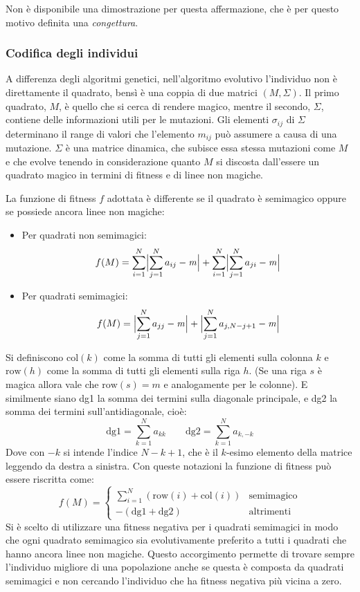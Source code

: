 \documentclass[italian,twoside,twocolumn]{article}
\begin{document}
Non è disponibile una dimostrazione per questa affermazione, che è per questo motivo definita una \emph{congettura}.

\subsubsection{Codifica degli individui}
A differenza degli algoritmi genetici, nell'algoritmo evolutivo l'individuo non è direttamente il quadrato, bensì è una coppia di due matrici $ \left(M, \Sigma \right) $. Il primo quadrato, $ M $, è quello che si cerca di rendere magico, mentre il secondo, $ \Sigma $, contiene delle informazioni utili per le mutazioni. Gli elementi $ \sigma_{ij} $ di $ \Sigma $ determinano il range di valori che l'elemento $ m_{ij} $ può assumere a causa di una mutazione. $ \Sigma $ è una matrice dinamica, che subisce essa stessa mutazioni come $ M $ e che evolve tenendo in considerazione quanto $ M $ si discosta dall'essere un quadrato magico in termini di fitness e di linee non magiche.

La funzione di fitness $ f $ adottata è differente se il quadrato è semimagico oppure se possiede ancora linee non magiche:
\begin{itemize}
	\item Per quadrati non semimagici:
	\[	f(M) = \sum_{i=1}^{N}\Bigl\lvert\sum_{j=1}^{N} a_{ij} - \mathit{m} \Bigr\rvert + \sum_{i=1}^{N}\Bigl\lvert\sum_{j=1}^{N} a_{ji} - \mathit{m} \Bigr\rvert 	\]
	\item Per quadrati semimagici:
	\[	f(M) = \Bigl\lvert\sum_{j=1}^{N} a_{jj} - \mathit{m} \Bigr\rvert + \Bigl\lvert\sum_{j=1}^{N} a_{j,N-j+1} - \mathit{m} \Bigr\rvert 	\]	
\end{itemize}
Si definiscono $ \text{col}(k) $ come la somma di tutti gli elementi sulla colonna $ k $ e $ \text{row}(h) $ come la somma di tutti gli elementi sulla riga $ h $. (Se una riga $ s $ è magica allora vale che $ \text{row}(s) = \mathit{m}$ e analogamente per le colonne). E similmente siano dg1 la somma dei termini sulla diagonale principale, e dg2 la somma dei termini sull'antidiagonale, cioè:
\[\text{dg1} = \sum_{k = 1}^Na_{kk}  \qquad \text{dg2} = \sum_{k = 1}^Na_{k,-k}  \]
Dove con $ -k $ si intende l'indice $ N-k+1 $, che è il $ k $-esimo elemento della matrice leggendo da destra a sinistra.
Con queste notazioni la funzione di fitness può essere riscritta come:
\[ f(M) = 
\begin{cases}
\sum_{i = 1}^{N}\left(\text{row}(i) + \text{col}(i) \right) & \text{semimagico} \\
- \left(\text{dg1} + \text{dg2} \right) & \text{altrimenti} 
\end{cases}
\]
Si è scelto di utilizzare una fitness negativa per i quadrati semimagici in modo che ogni quadrato semimagico sia evolutivamente preferito a tutti i quadrati che hanno ancora linee non magiche. Questo accorgimento permette di trovare sempre l'individuo migliore di una popolazione anche se questa è composta da quadrati semimagici e non cercando l'individuo che ha fitness negativa più vicina a zero.   
\end{document}
